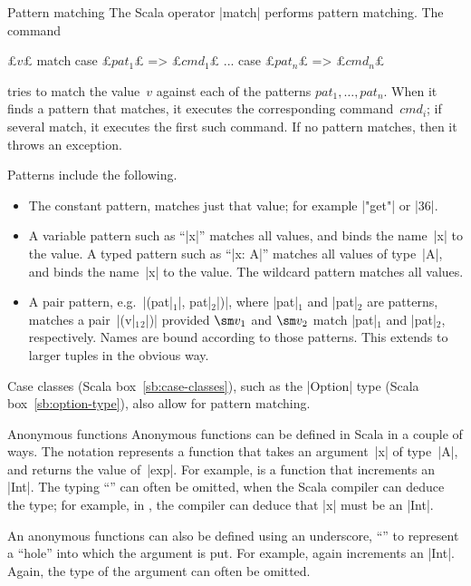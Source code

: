 \begin{scalaBox}{Pattern matching}
\label{sb:pattern-matching}
The Scala operator |match| performs pattern matching.  The command
%
\begin{scala}
  £$v$£ match{
    case £$pat_1$£ => £$cmd_1$£
    ...
    case £$pat_n$£ => £$cmd_n$£
  }
\end{scala}
tries to match the value~$v$ against each of the patterns $pat_1, \ldots,
pat_n$.  When it finds a pattern that matches, it executes the corresponding
command~$cmd_i$; if several match, it executes the first such command.  If no
pattern matches, then it throws an exception.

Patterns include the following.
\begin{itemize}
\item The constant pattern, matches just that value; for example |"get"| or
  |36|.

\item A variable pattern such as ``|x|'' matches all values, and binds the
name~|x| to the value.  A typed pattern such as ``|x: A|'' matches all values
of type~|A|, and binds the name~|x| to the value.  The wildcard pattern
\SCALA{\_} matches all values.  

\item A pair pattern, e.g.~|(pat|$_1$|, pat|$_2$|)|, where |pat|$_1$ and
  |pat|$_2$ are patterns, matches a pair~|(v|$_1$$_2$|)| provided
  $\sm v_1$ and $\sm v_2$ match |pat|$_1$ and |pat|$_2$, respectively.  Names
  are bound according to those patterns.  This extends to larger tuples in the
  obvious way.
\end{itemize}
%
Case classes (Scala box~\ref{sb:case-classes}), such as the |Option| type
(Scala box~\ref{sb:option-type}), also allow for pattern matching.
\end{scalaBox}


\begin{scalaBox}{Anonymous functions}
\label{sb:anon-function}
Anonymous functions can be defined in Scala in a couple of ways.  The notation
 represents a function that takes an argument~|x| of
type~|A|, and returns the value of~|exp|.  For example,  is a function that increments an |Int|.  The typing ``'' can
often be omitted, when the Scala compiler can deduce the type; for example, in
, the compiler can deduce that |x| must be an
|Int|.

An anonymous functions can also be defined using an underscore, ``\SCALA{_}'' to
represent a ``hole'' into which the argument is put.  For example,
 again increments an |Int|.  Again, the type of the
argument can often be omitted. 
\end{scalaBox}

